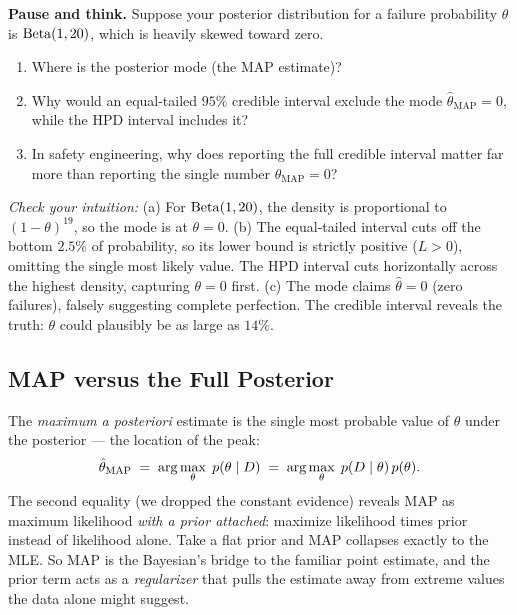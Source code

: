 \begin{recoverybox}
\textbf{Pause and think.} Suppose your posterior distribution for a failure probability $\theta$ is $\operatorname{Beta}(1, 20)$, which is heavily skewed toward zero.
\begin{enumerate}[label=(\alph*)]
  \item Where is the posterior mode (the MAP estimate)?
  \item Why would an equal-tailed $95\%$ credible interval exclude the mode $\hat\theta_{\mathrm{MAP}} = 0$, while the HPD interval includes it?
  \item In safety engineering, why does reporting the full credible interval matter far more than reporting the single number $\hat\theta_{\mathrm{MAP}} = 0$?
\end{enumerate}
\textit{Check your intuition:}
(a) For $\operatorname{Beta}(1, 20)$, the density is proportional to $(1-\theta)^{19}$, so the mode is at $\theta = 0$.
(b) The equal-tailed interval cuts off the bottom $2.5\%$ of probability, so its lower bound is strictly positive ($L > 0$), omitting the single most likely value. The HPD interval cuts horizontally across the highest density, capturing $\theta=0$ first.
(c) The mode claims $\hat\theta=0$ (zero failures), falsely suggesting complete perfection. The credible interval reveals the truth: $\theta$ could plausibly be as large as $14\%$.
\end{recoverybox}

\subsection{MAP versus the Full Posterior}

The \emph{maximum a posteriori} estimate is the single most probable value of $\theta$
under the posterior --- the location of the peak:
\[
  \hat\theta_{\text{MAP}} \;=\; \arg\max_\theta\; p(\theta\mid D)
  \;=\; \arg\max_\theta\; p(D\mid\theta)\,p(\theta).
\]
The second equality (we dropped the constant evidence) reveals MAP as maximum likelihood
\emph{with a prior attached}: maximize likelihood times prior instead of likelihood alone.
Take a flat prior and MAP collapses exactly to the MLE. So MAP is the Bayesian's bridge to
the familiar point estimate, and the prior term acts as a \emph{regularizer} that pulls the
estimate away from extreme values the data alone might suggest.

